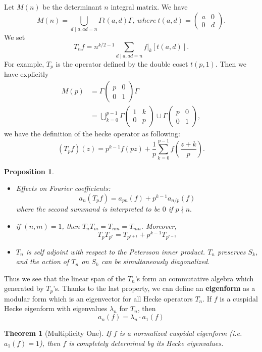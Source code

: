 \documentclass[11pt,english]{smfart}
\newtheorem{theorem}{Theorem}
\newtheorem{proposition}{Proposition}[section]
\theoremstyle{definition}
\theoremstyle{remark}
\begin{document}
Let $M(n)$ be the determinant $n$ integral matrix. We have
\[M(n)=\bigcup_{d \mid a, a d=n} \Gamma t(a, d) \Gamma,\ where\ t(a, d)=\left(\begin{array}{ll}
a & 0 \\
0 & d
\end{array}\right) .\]
We set
\[T_{n}f=n^{k / 2-1} \sum_{d \mid a, a d=n} \left.f\right|_{k}[t(a, d)] .\]
For example, $ T_{p} $ is the operator defined by the double coset $t(p, 1) $. Then we have explicitly
\[\begin{aligned}
M(p) & =\Gamma\left(\begin{array}{ll}
p & 0 \\
0 & 1
\end{array}\right) \Gamma \\
& =\bigcup_{k=0}^{p-1} \Gamma\left(\begin{array}{ll}
1 & k \\
0 & p
\end{array}\right) \cup \Gamma\left(\begin{array}{ll}
p & 0 \\
0 & 1
\end{array}\right),
\end{aligned}\]
we have the definition of the hecke operator as following:
\[(T_{p}f)(z)=p^{k-1} f(p z)+\frac{1}{p} \sum_{k=0}^{p-1} f\left(\frac{z+k}{p}\right) .\]
\begin{proposition}
\begin{itemize}
    \item Effects on Fourier coefficients:
    \[a_n(T_pf) =a_{pn}(f)+p^{k-1}a_{n/p}(f)\]
where the second summand is interpreted to be $0$ if $p\nmid n.$ 
    \item if $(n,m)=1$, then $T_nT_m=T_{nm}=T_{mn}$. Moreover,
    \[ T_pT_{p^r}=T_{p^{r+1}}+p^{k-1} T_{p^{r-1}}\]
    \item $T_n$ is self adjoint with respect to the Petersson inner product.
    $T_n$ preserves $S_k$, and the action of ${T_n}$ on $S_k$ can be simultaneously diagonalized.
\end{itemize}
\end{proposition}
Thus we see that the linear span of the $T_n$'s form an commutative algebra which generated by $T_p$'s.
Thanks to the last property, we can define an \textbf{eigenform} as a modular form which is an eigenvector for all Hecke operators $T_n$.
If $f$ is a cuspidal Hecke eigenform with eigenvalues $\lambda_n$ for $T_n$, then
\[a_n(f)=\lambda _n \cdot a_1(f)\]
\begin{theorem}[Multiplicity One]
If $f$ is a normalized cuspidal eigenform (i.e. $a_1(f)=1$), then $f$ is completely determined by its Hecke eigenvalues.
\end{theorem}
\end{document}

